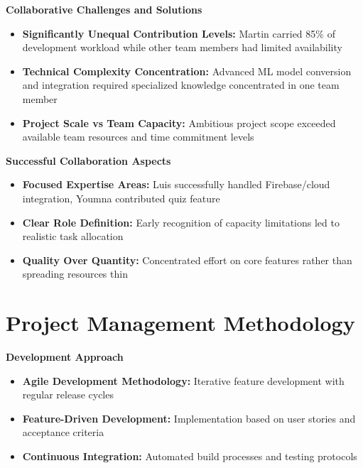 \textbf{Collaborative Challenges and Solutions}
\begin{itemize}
    \item \textbf{Significantly Unequal Contribution Levels:} Martin carried 85\% of development workload while other team members had limited availability
    \item \textbf{Technical Complexity Concentration:} Advanced ML model conversion and integration required specialized knowledge concentrated in one team member
    \item \textbf{Project Scale vs Team Capacity:} Ambitious project scope exceeded available team resources and time commitment levels
\end{itemize}

\textbf{Successful Collaboration Aspects}
\begin{itemize}
    \item \textbf{Focused Expertise Areas:} Luis successfully handled Firebase/cloud integration, Youmna contributed quiz feature
    \item \textbf{Clear Role Definition:} Early recognition of capacity limitations led to realistic task allocation
    \item \textbf{Quality Over Quantity:} Concentrated effort on core features rather than spreading resources thin
\end{itemize}

\section{Project Management Methodology}

\textbf{Development Approach}
\begin{itemize}
    \item \textbf{Agile Development Methodology:} Iterative feature development with regular release cycles
    \item \textbf{Feature-Driven Development:} Implementation based on user stories and acceptance criteria
    \item \textbf{Continuous Integration:} Automated build processes and testing protocols
\end{itemize}

